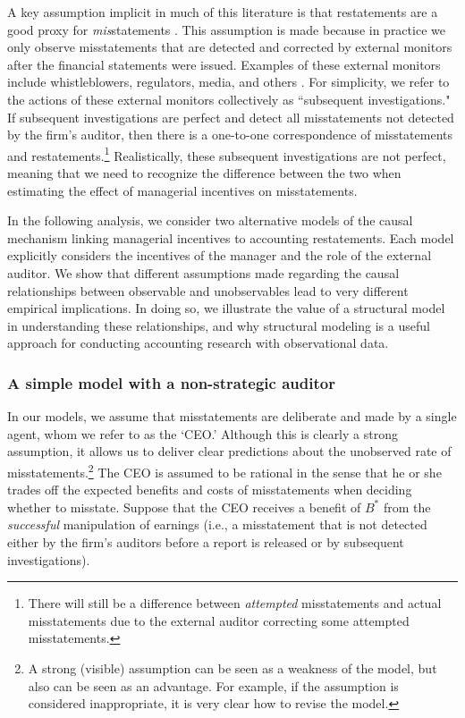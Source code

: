 A key assumption implicit in much of this literature is that restatements are a good proxy for \emph{mis}statements \citep[e.g.,][]{Efendi:2007ja,Armstrong:2010jd}. 
This assumption is made because in practice we only observe misstatements that are detected and corrected by external monitors after the financial statements were issued. 
Examples of these external monitors include whistleblowers, regulators, media, and others \citep{Dyck:2010kh}.  For simplicity,  we refer to the actions of these external monitors collectively as ``subsequent investigations."
If subsequent investigations are perfect and detect all misstatements not detected by the firm's auditor, then there is a one-to-one correspondence of misstatements and restatements.\footnote{There will still be a difference between \emph{attempted} misstatements and actual misstatements due to the external auditor correcting some attempted misstatements.}
Realistically, these subsequent investigations are not perfect, meaning that we need to recognize the difference between the two when estimating the effect of managerial incentives on misstatements.  

In the following analysis, we consider two alternative models of the causal mechanism linking managerial incentives to accounting restatements.
Each model explicitly considers the incentives of the manager and the role of the external auditor. 
We show that different assumptions made regarding the causal relationships between observable and unobservables lead to very different empirical implications.
In doing so, we illustrate the value of a structural model in understanding these relationships, and why structural modeling is a useful approach for conducting accounting research with observational data.

\subsubsection{A simple model with a non-strategic auditor}
In our models, we assume that misstatements are deliberate and made by a single agent, whom we refer to as the `CEO.'
Although this is clearly a strong assumption, it allows us to deliver clear predictions about the unobserved rate of misstatements.\footnote{
A strong (visible) assumption can be seen as a weakness of the model, but also can be seen as an advantage.
For example, if the assumption is considered inappropriate, it is very clear how to revise the model.} 
The CEO is assumed to be rational in the sense that he or she trades off the expected benefits and costs of misstatements when deciding whether to misstate.
Suppose that the CEO receives a benefit of $B^*$ from the \emph{successful} manipulation of earnings (i.e., a misstatement that is not detected either by the firm's auditors before a report is released or by subsequent investigations). 

